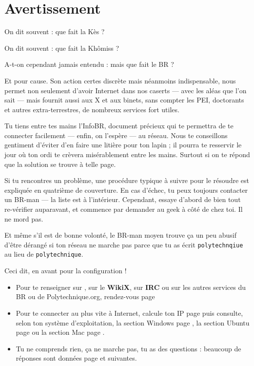 \thispagestyle{empty}

\section*{Avertissement}

On dit souvent : \og que fait la Kès ? \fg

On dit souvent : \og que fait la Khômiss ? \fg

A-t-on cependant jamais entendu : \og mais que fait le BR ? \fg

Et pour cause. Son action certes discrète mais néanmoins indispensable, nous permet non seulement d'avoir Internet dans nos caserts --- avec les aléas que l'on sait --- mais fournit aussi aux X et aux binets,
sans compter les PEI, doctorants et autres extra-terrestres, de nombreux services fort utiles.

Tu tiens entre tes mains l'InfoBR, document pr\'ecieux qui te permettra de te connecter facilement
--- enfin, on l'esp\`ere --- au r\'eseau.
Nous te conseillons gentiment d'\'eviter d'en faire une liti\`ere pour ton lapin ; il pourra te resservir le jour o\`u ton ordi te cr\`evera mis\'erablement entre les
mains. Surtout si on te r\'epond que la solution se trouve \`a telle page.

Si tu rencontres un probl\`eme, une proc\'edure typique \`a suivre pour le r\'esoudre est expliqu\'ee en quatri\`eme de couverture.
En cas d'échec, tu peux toujours contacter un BR-man --- la liste est \`a l'int\'erieur.
Cependant, essaye d'abord de bien tout re-v\'erifier auparavant, et commence par demander au geek à côté de chez toi. Il ne mord pas.

Et m\^eme s'il est de bonne volont\'e, le BR-man moyen trouve ça un peu abusif d'\^etre d\'erang\'e si ton r\'eseau ne
marche pas parce que tu as \'ecrit \texttt{polytechnqiue} au lieu de \texttt{polytechnique}.

Ceci dit, en avant pour la configuration !

\vfill

\begin{itemize}
\item Pour te renseigner sur \fkz, sur le \textbf{WikiX}, sur \textbf{IRC} ou sur les autres services du BR ou de Polytechnique.org, rendez-vous page \pageref{services}
\item Pour te connecter au plus vite à Internet, calcule ton IP page \pageref{ip} puis consulte, selon ton système d'exploitation, la section Windows page \pageref{windows},
la section Ubuntu page \pageref{ubuntu} ou la section Mac page \pageref{mac}.
\item Tu ne comprends rien, ça ne marche pas, tu as des questions : beaucoup de réponses sont données page \pageref{faq} et suivantes.

\end{itemize}

